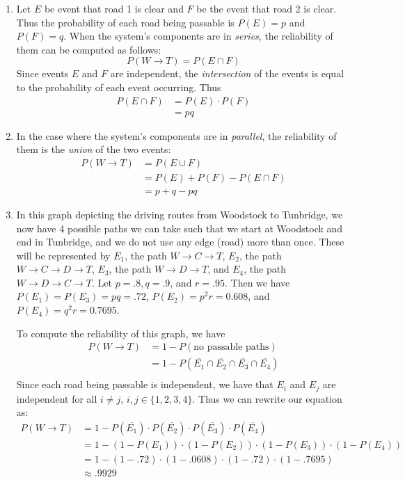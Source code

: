 \documentclass[11pt, oneside]{article}   	%
\begin{document}
\begin{enumerate}[\quad (a)]
	\item Let $E$ be event that road 1 is clear and $F$ be the event that road 2 is clear. Thus the probability of each road being passable is $P(E) = p$ and $P(F) = q$. When the system's components are in \textit{series}, the reliability of them can be computed as follows:
	$$P(W \rightarrow T) = P(E \cap F)$$
Since events $E$ and $F$ are independent, the \textit{intersection} of the events is equal to the probability of each event occurring. Thus
	\begin{align*}
		P(E \cap F) & = P(E) \cdot P(F)\\
		& = pq 
	\end{align*}
	\item In the case where the system's components are in \textit{parallel}, the reliability of them is the \textit{union} of the two events:
	\begin{align*}
		P(W \rightarrow T) & = P(E \cup F) \\
		& = P(E) + P(F) - P(E \cap F) \\
		& = p + q - pq
	\end{align*}
	\item In this graph depicting the driving routes from Woodstock to Tunbridge, we now have 4 possible paths we can take such that we start at Woodstock and end in Tunbridge, and we do not use any edge (road) more than once. These will be represented by $E_1$, the path $W \rightarrow C \rightarrow T$, $E_2$, the path $W \rightarrow C \rightarrow D \rightarrow T$, $E_3$, the path $W \rightarrow D \rightarrow T$, and $E_4$, the path $W \rightarrow D \rightarrow C \rightarrow T$. Let $p=.8, q=.9$, and $r=.95$. Then we have $P(E_1)=P(E_3)=pq=.72$, $P(E_2) = p^2r = 0.608$, and $P(E_4)=q^2r=0.7695$.
	
	To compute the reliability of this graph, we have
	\begin{align*}
		P(W \rightarrow T) & = 1 - P(\text{no passable paths})\\
		& = 1 - P(\overline{E_1} \cap \overline{E_2} \cap \overline{E_3} \cap \overline{E_4}) \\
	\end{align*}
	Since each road being passable is independent, we have that $E_i$ and $E_j$ are independent for all $i \neq j$, $i, j \in \{1,2,3,4\}$. Thus we can rewrite our equation as:
	\begin{align*}
		P(W \rightarrow T) & = 1 - P(\overline{E_1}) \cdot P(\overline{E_2}) \cdot P(\overline{E_3}) \cdot P(\overline{E_4}) \\
		& = 1 - (1-P(E_1)) \cdot (1-P(E_2)) \cdot (1-P(E_3)) \cdot (1-P(E_4)) \\
		& = 1 - (1 - .72) \cdot (1 - .0608) \cdot (1- .72) \cdot (1-.7695) \\
		& \approx .9929
	\end{align*}

\end{enumerate}
\end{document}
